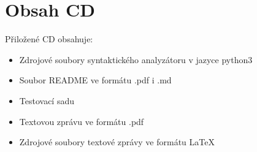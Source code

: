 \chapter{Obsah CD}
Přiložené CD obsahuje:
\begin{itemize}
  \item Zdrojové soubory syntaktického analyzátoru v jazyce python3
  \item Soubor README ve formátu .pdf i .md
  \item Testovací sadu
  \item Textovou zprávu ve formátu .pdf
  \item Zdrojové soubory textové zprávy ve formátu \LaTeX
\end{itemize}
